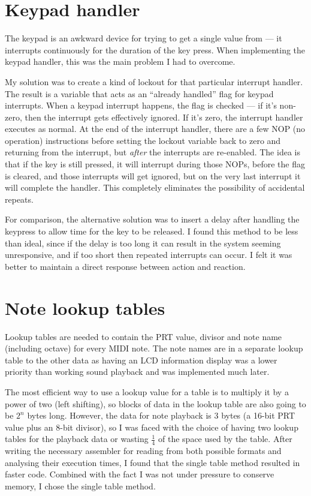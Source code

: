 \section{Keypad handler}
\label{sec:design:keypad_handler}

The keypad is an awkward device for trying to get a single value from --- it interrupts continuously 
for the duration of the key press.  When implementing the keypad handler, this was the main problem 
I had to overcome.

My solution was to create a kind of lockout for that particular interrupt handler.  The result is a 
variable that acts as an ``already handled'' flag for keypad interrupts.  When a keypad interrupt 
happens, the flag is checked --- if it's non-zero, then the interrupt gets effectively ignored.  If 
it's zero, the interrupt handler executes as normal.  At the end of the interrupt handler, there are 
a few NOP (no operation) instructions before setting the lockout variable back to zero and returning 
from the interrupt, but \emph{after} the interrupts are re-enabled.  The idea is that if the key is 
still pressed, it will interrupt during those NOPs, before the flag is cleared, and those interrupts 
will get ignored, but on the very last interrupt it will complete the handler.  This completely 
eliminates the possibility of accidental repeats.

For comparison, the alternative solution was to insert a delay after handling the keypress to allow 
time for the key to be released.  I found this method to be less than ideal, since if the delay is 
too long it can result in the system seeming unresponsive, and if too short then repeated interrupts 
can occur.  I felt it was better to maintain a direct response between action and reaction.

\section{Note lookup tables}
\label{notelookuptables}

Lookup tables are needed to contain the PRT value, divisor and note name (including octave) for 
every MIDI note.  The note names are in a separate lookup table to the other data as having an LCD 
information display was a lower priority than working sound playback and was implemented much later.

The most efficient way to use a lookup value for a table is to multiply it by a power of two (left 
shifting), so blocks of data in the lookup table are also going to be $2^n$ bytes long.  However, 
the data for note playback is 3 bytes (a 16-bit PRT value plus an 8-bit divisor), so I was faced 
with the choice of having two lookup tables for the playback data or wasting $\frac{1}{4}$ of the 
space used by the table.  After writing the necessary assembler for reading from both possible 
formats and analysing their execution times, I found that the single table method resulted in faster 
code.  Combined with the fact I was not under pressure to conserve memory, I chose the single table 
method.

